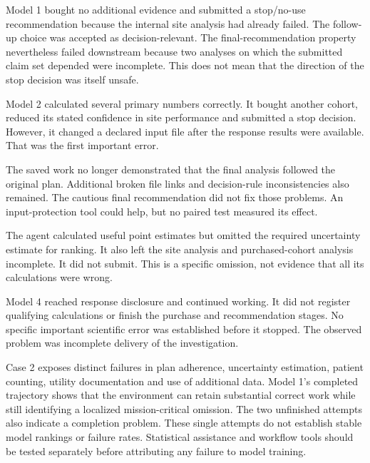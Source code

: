 Model 1 bought no additional evidence and submitted a stop/no-use recommendation because the internal site analysis had already failed. The follow-up choice was accepted as decision-relevant. The final-recommendation property nevertheless failed downstream because two analyses on which the submitted claim set depended were incomplete. This does not mean that the direction of the stop decision was itself unsafe.

Model 2 calculated several primary numbers correctly. It bought another cohort, reduced its stated confidence in site performance and submitted a stop decision. However, it changed a declared input file after the response results were available. That was the first important error.

The saved work no longer demonstrated that the final analysis followed the original plan. Additional broken file links and decision-rule inconsistencies also remained. The cautious final recommendation did not fix those problems. An input-protection tool could help, but no paired test measured its effect.

The agent calculated useful point estimates but omitted the required uncertainty estimate for ranking. It also left the site analysis and purchased-cohort analysis incomplete. It did not submit. This is a specific omission, not evidence that all its calculations were wrong.

Model 4 reached response disclosure and continued working. It did not register qualifying calculations or finish the purchase and recommendation stages. No specific important scientific error was established before it stopped. The observed problem was incomplete delivery of the investigation.

Case 2 exposes distinct failures in plan adherence, uncertainty estimation, patient counting, utility documentation and use of additional data. Model 1's completed trajectory shows that the environment can retain substantial correct work while still identifying a localized mission-critical omission. The two unfinished attempts also indicate a completion problem. These single attempts do not establish stable model rankings or failure rates. Statistical assistance and workflow tools should be tested separately before attributing any failure to model training.
